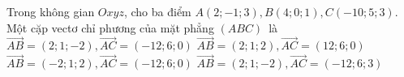 \begin{ex}%
	Trong không gian $Oxyz$, cho ba điểm $A(2;-1;3), B(4;0;1), C(-10;5;3)$. Một cặp vectơ chỉ  phương của mặt phẳng $(ABC)$~là
	 \choice
		{$\overrightarrow{AB}=(2;1;-2),  \overrightarrow{AC}=(-12;6;0)$}
		{$\overrightarrow{AB}=(2;1;2),  \overrightarrow{AC}=(12;6;0)$}
		 {\True $\overrightarrow{AB}=(-2;1;2), \overrightarrow{AC}=(-12;6;0)$}
		{$\overrightarrow{AB}=(2;1;-2), \overrightarrow{AC}=(-12;6;3)$} 
\end{ex}

